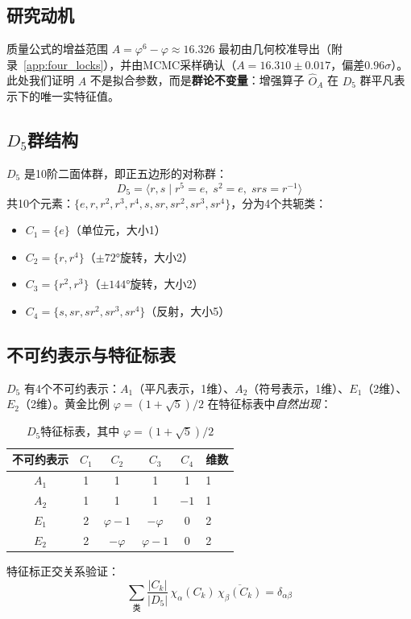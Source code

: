 \documentclass[12pt,a4paper,twocolumn]{article}
\renewcommand{\phi}{\varphi}
\begin{document}
\subsection{研究动机}
质量公式的增益范围 $A = \phi^6 - \phi \approx 16.326$ 最初由几何校准导出（附录~\ref{app:four_locks}），并由MCMC采样确认（$A = 16.310 \pm 0.017$，偏差$0.96\sigma$）。此处我们证明 $A$ 不是拟合参数，而是\textbf{群论不变量}：增强算子 $\hat{O}_A$ 在 $D_5$ 群平凡表示下的唯一实特征值。

\subsection{$D_5$群结构}
$D_5$ 是10阶二面体群，即正五边形的对称群：
\[
D_5 = \langle r, s \mid r^5 = e,\; s^2 = e,\; srs = r^{-1} \rangle
\]
共10个元素：$\{e, r, r^2, r^3, r^4, s, sr, sr^2, sr^3, sr^4\}$，分为4个共轭类：
\begin{itemize}
\item $C_1 = \{e\}$（单位元，大小1）
\item $C_2 = \{r, r^4\}$（$\pm 72°$旋转，大小2）
\item $C_3 = \{r^2, r^3\}$（$\pm 144°$旋转，大小2）
\item $C_4 = \{s, sr, sr^2, sr^3, sr^4\}$（反射，大小5）
\end{itemize}

\subsection{不可约表示与特征标表}
$D_5$ 有4个不可约表示：$A_1$（平凡表示，1维）、$A_2$（符号表示，1维）、$E_1$（2维）、$E_2$（2维）。黄金比例 $\phi = (1+\sqrt{5})/2$ 在特征标表中\emph{自然出现}：

\begin{table}[H]
\centering
\caption{$D_5$特征标表，其中 $\phi = (1+\sqrt{5})/2$}
\label{tab:d5_character_cn}
\begin{tabular}{c|cccc|l}
\hline
不可约表示 & $C_1$ & $C_2$ & $C_3$ & $C_4$ & 维数 \\
\hline
$A_1$ & 1 & 1 & 1 & 1 & 1 \\
$A_2$ & 1 & 1 & 1 & $-1$ & 1 \\
$E_1$ & 2 & $\phi - 1$ & $-\phi$ & 0 & 2 \\
$E_2$ & 2 & $-\phi$ & $\phi - 1$ & 0 & 2 \\
\hline
\end{tabular}
\end{table}

特征标正交关系验证：
\[
\sum_{\text{类}} \frac{|C_k|}{|D_5|} \, \chi_\alpha(C_k) \, \overline{\chi_\beta(C_k)} = \delta_{\alpha\beta}
\]
\end{document}
